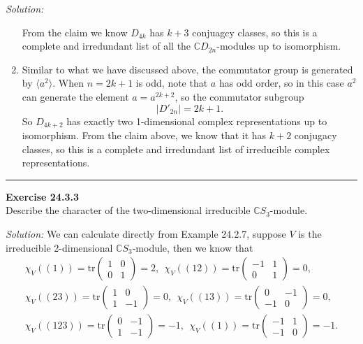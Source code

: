 \documentclass[a4paper, 12pt]{article}
\newenvironment{problem}[2][Exercise]
    { \begin{mdframed}[backgroundcolor=gray!20] \textbf{#1 #2} \\}
    {  \end{mdframed}}
\newenvironment{solution}
    {\textit{Solution:}}
    {}
\newcommand{\la}{\langle}
\newcommand{\ra}{\rangle}
\newcommand{\tr}{\text{tr}}
\begin{document}
\begin{solution}
\begin{enumerate}[(1)]
From the claim we know \(D_{4k}\) has \(k+3\) conjuagcy classes, so this is a complete and irredundant list of all the \(\mathbb{C}D_{2n}\)-modules up to isomorphism.
\item Similar to what we have discussed above, the commutator group is generated by \(\la a^2\ra\). When \(n=2k+1\) is odd, note that \(a\) has odd order, so in this case \(a^2\) can generate the element \(a=a^{2k+2}\), so the commutator subgroup   
\[|D'_{2n}|=2k+1.\]
So \(D_{4k+2}\) has exactly two 1-dimensional complex representations up to isomorphism. From the claim above, we know that it has \(k+2\) conjugacy classes, so this is a complete and irredundant list of irreducible complex representations.
\end{enumerate}
\end{solution}

\noindent\rule{7in}{2.8pt}
\begin{problem}{24.3.3}
Describe the character of the two-dimensional irreducible \(\mathbb{C}S_3\)-module.
\end{problem}
\begin{solution}
We can calculate directly from Example 24.2.7, suppose \(V\) is the irreducible 2-dimensional \(\mathbb{C}S_3\)-module, then we know that 
\begin{align*}
	\chi_V((1))=\tr\begin{pmatrix}
		1&0\\ 
		0&1
	\end{pmatrix}=2,\ \ \chi_V((12))=\tr\begin{pmatrix}
		-1&1\\ 
		0&1
	\end{pmatrix}=0,\\ 
	\chi_V((23))=\tr\begin{pmatrix}
        1&0\\ 
		1&-1
	\end{pmatrix}=0,\ \ \chi_V((13))=\tr\begin{pmatrix}
	     0&-1\\ 
		-1&0
	\end{pmatrix}=0,\\ 
	\chi_V((123))=\tr\begin{pmatrix}
         0&-1\\ 
		 1&-1
	\end{pmatrix}=-1,\ \ \chi_V((1))=\tr\begin{pmatrix}
	     -1&1\\ 
		 -1&0
	\end{pmatrix}=-1.
\end{align*}
\end{solution}
\end{document}
